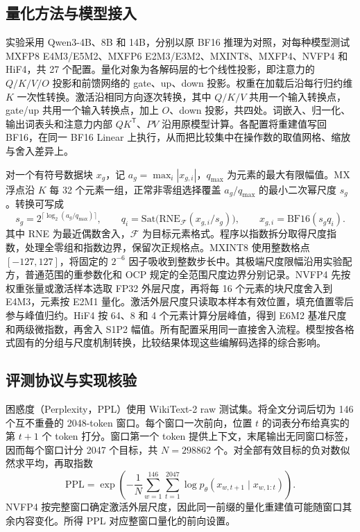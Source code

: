 \documentclass[10.5pt,compsoc,UTF8]{CjC}
\begin{document}
\subsection{量化方法与模型接入}

实验采用 Qwen3-4B、8B 和 14B，分别以原 BF16 推理为对照，对每种模型测试 MXFP8 E4M3/E5M2、MXFP6 E2M3/E3M2、MXINT8、MXFP4、NVFP4 和 HiF4，共 27 个配置。量化对象为各解码层的七个线性投影，即注意力的 $Q/K/V/O$ 投影和前馈网络的 gate、up、down 投影。权重在加载后沿每行归约维 $K$ 一次性转换。激活沿相同方向逐次转换，其中 $Q/K/V$ 共用一个输入转换点，gate/up 共用一个输入转换点，加上 $O$、down 投影，共四处。词嵌入、归一化、输出词表头和注意力内部 $QK^{\mathsf T}$、$PV$ 沿用原模型计算。各配置将重建值写回 BF16，在同一 BF16 Linear 上执行，从而把比较集中在操作数的取值网格、缩放与舍入差异上。

对一个有符号数据块 $x_g$，记 $a_g=\max_i |x_{g,i}|$，$q_{\max}$ 为元素的最大有限幅值。MX 浮点沿 $K$ 每 32 个元素一组，正常非零组选择覆盖 $a_g/q_{\max}$ 的最小二次幂尺度 $s_g$。转换可写成
\begin{equation}
  s_g=2^{\lceil\log_2(a_g/q_{\max})\rceil},\qquad
  q_i=\mathrm{Sat}\bigl(\mathrm{RNE}_{\mathcal{F}}(x_{g,i}/s_g)\bigr),\qquad
  \hat{x}_{g,i}=\mathrm{BF16}(s_gq_i).
\end{equation}
其中 RNE 为最近偶数舍入，$\mathcal{F}$ 为目标元素格式。程序以指数拆分取得尺度指数，处理全零组和指数边界，保留次正规格点。MXINT8 使用整数格点 $[-127,127]$，将固定的 $2^{-6}$ 因子吸收到整数步长中。其极端尺度限幅沿用实验配方，普通范围的重参数化和 OCP 规定的全范围尺度边界分别记录。NVFP4 先按权重张量或激活样本选取 FP32 外层尺度，再将每 16 个元素的块尺度舍入到 E4M3，元素按 E2M1 量化。激活外层尺度只读取本样本有效位置，填充值置零后参与峰值归约。HiF4 按 64、8 和 4 个元素计算分层峰值，得到 E6M2 基准尺度和两级微指数，再舍入 S1P2 幅值。所有配置采用同一直接舍入流程。模型按各格式固有的分组与尺度机制转换，比较结果体现这些编解码选择的综合影响。

\subsection{评测协议与实现核验}

困惑度（Perplexity，PPL）使用 WikiText-2 raw 测试集\cite{merity2016pointer}。将全文分词后切为 146 个互不重叠的 2048-token 窗口。每个窗口一次前向，位置 $t$ 的词表分布给真实的第 $t+1$ 个 token 打分。窗口第一个 token 提供上下文，末尾输出无同窗口标签，因而每个窗口计分 2047 个目标，共 $N=298862$ 个。对全部有效目标的负对数似然求平均，再取指数
\begin{equation}
  \mathrm{PPL}=\exp\left(-\frac{1}{N}\sum_{w=1}^{146}\sum_{t=1}^{2047}
    \log p_\theta(x_{w,t+1}\mid x_{w,1:t})\right).
\end{equation}
NVFP4 按完整窗口确定激活外层尺度，因此同一前缀的量化重建值可能随窗口其余内容变化。所得 PPL 对应整窗口量化的前向设置。
\end{document}
